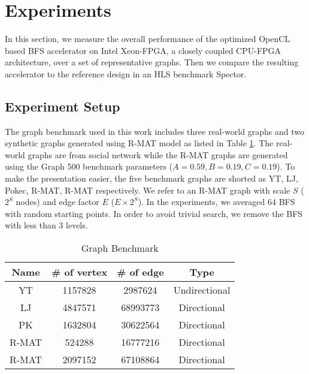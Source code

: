 \section{Experiments} \label{sec:experiment}
In this section, we measure the overall performance of the optimized 
OpenCL based BFS accelerator on Intel Xeon-FPGA, a closely coupled CPU-FPGA
architecture, over a set of representative graphs. Then we compare the 
resulting accelerator to the reference design in an HLS benchmark Spector.

\subsection{Experiment Setup}
The graph benchmark used in this work includes three real-world graphs and 
two synthetic graphs generated using R-MAT model \cite{chakrabarti2004rmat} 
as listed in Table \ref{tab:graph}. The real-world graphs are from social network \cite{yang2012defining, 
leskovec2009community, takac2012data} while the R-MAT graphs are generated 
using the Graph 500 benchmark parameters ($A=0.59, B=0.19, C=0.19$). To make the 
presentation easier, the five benchmark graphs are shorted as YT, 
LJ, Pokec, R-MAT\uppercase\expandafter{}, 
R-MAT\uppercase\expandafter{} respectively. We refer 
to an R-MAT graph with scale $S$ ($2^{S}$ nodes) and edge factor $E$ ($E\times 2^{S}$). 
In the experiments, we averaged 64 BFS with random starting points. 
In order to avoid trivial search, we remove the BFS with less than 3 levels.

\begin{table}
    \centering
  \caption{Graph Benchmark}
  \label{tab:graph}
  \begin{tabular}{cccc}
    \toprule
      Name & \# of vertex & \# of edge & Type \\
    \midrule
      YT \cite{yang2012defining} & 1157828 & 2987624 & Undirectional \\
      LJ \cite{leskovec2009community} & 4847571 & 68993773 & Directional \\
      PK \cite{takac2012data} & 1632804 & 30622564 & Directional \\
      R-MAT\uppercase\expandafter{\romannumeral1} & 524288 & 16777216 & Directional \\
      R-MAT\uppercase\expandafter{\romannumeral2} & 2097152 & 67108864 & Directional \\
  \bottomrule
\end{tabular}
\vspace{-1em}
\end{table}

